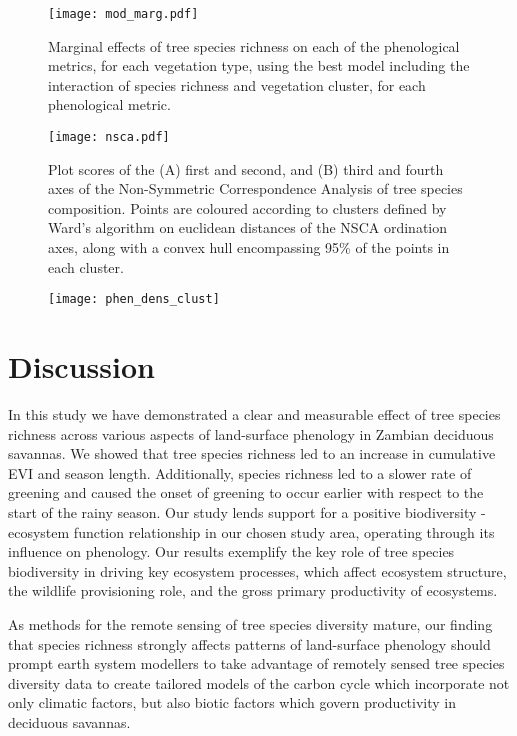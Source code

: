 \documentclass[11pt,a4paper]{article}
\begin{document}
\begin{figure}[H]
\centering
	\texttt{[image: mod\_marg.pdf]}
	\caption{Marginal effects of tree species richness on each of the phenological metrics, for each vegetation type, using the best model including the interaction of species richness and vegetation cluster, for each phenological metric.}
	\label{mod_marg}
\end{figure}

\begin{figure}[H]
\centering
	\texttt{[image: nsca.pdf]}
	\caption{Plot scores of the (A) first and second, and (B) third and fourth axes of the Non-Symmetric Correspondence Analysis of tree species composition. Points are coloured according to clusters defined by Ward's algorithm on euclidean distances of the NSCA ordination axes, along with a convex hull encompassing 95\% of the points in each cluster.}
	\label{nsca}
\end{figure}

\begin{figure}[H]
\centering
	\texttt{[image: phen\_dens\_clust]}
	\caption{}
	\label{phen_dens_clust}
\end{figure}

\section{Discussion}

In this study we have demonstrated a clear and measurable effect of tree species richness across various aspects of land-surface phenology in Zambian deciduous savannas. We showed that tree species richness led to an increase in cumulative EVI and season length. Additionally, species richness led to a slower rate of greening and caused the onset of greening to occur earlier with respect to the start of the rainy season. Our study lends support for a positive biodiversity - ecosystem function relationship in our chosen study area, operating through its influence on phenology. Our results exemplify the key role of tree species biodiversity in driving key ecosystem processes, which affect ecosystem structure, the wildlife provisioning role, and the gross primary productivity of ecosystems.

As methods for the remote sensing of tree species diversity mature, our finding that species richness strongly affects patterns of land-surface phenology should prompt earth system modellers to take advantage of remotely sensed tree species diversity data to create tailored models of the carbon cycle which incorporate not only climatic factors, but also biotic factors which govern productivity in deciduous savannas. 
\end{document}
